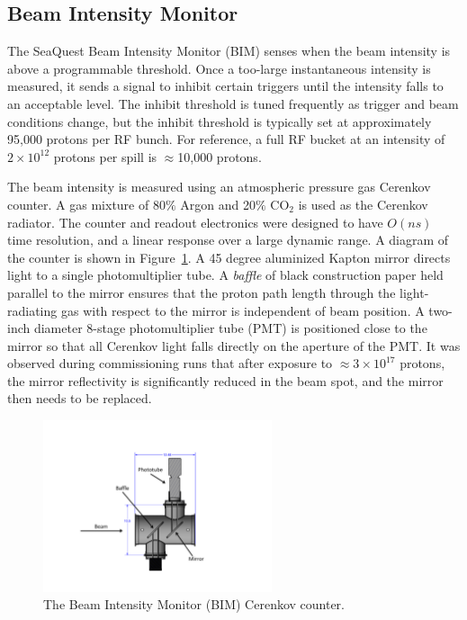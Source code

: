 \subsection{Beam Intensity Monitor}
The SeaQuest Beam Intensity Monitor (BIM) senses when the beam intensity is above a programmable threshold. Once a too-large instantaneous intensity is measured, it sends a signal to inhibit certain triggers until the intensity falls to an acceptable level.  The inhibit threshold is tuned frequently as trigger and beam conditions change, but the inhibit threshold is typically set at approximately 95,000 protons per RF bunch. For reference, a full RF bucket at an intensity of $2\times10^{12}$ protons per spill is $\approx$10,000 protons.

The beam intensity is measured using an atmospheric pressure gas Cerenkov counter. A gas mixture of 80$\%$ Argon and 20$\%$ CO$_2$ is used as the Cerenkov radiator. The counter and readout electronics were designed to have $O(ns)$ time resolution, and a linear response over a large dynamic range.  A diagram of the counter is shown in Figure~\ref{fig:BIMCerenkov}.  A 45 degree aluminized Kapton mirror directs light to a single photomultiplier tube.  A \emph{baffle} of black construction paper held parallel to the mirror ensures that the proton path length through the light-radiating gas with respect to the mirror is independent of beam position.  A two-inch diameter 8-stage photomultiplier tube (PMT) is positioned close to the mirror so that all Cerenkov light falls directly on the aperture of the PMT. It was observed during commissioning runs that after exposure to $\approx3\times10^{17}$ protons, the mirror reflectivity is significantly reduced in the beam spot, and the mirror then needs to be replaced.

\begin{figure}
\begin{center}
\includegraphics[width=0.6\textwidth]{figures/BIMCerenkov.pdf}
\caption{The Beam Intensity Monitor (BIM) Cerenkov counter.}
\label{fig:BIMCerenkov}
\end{center}
\end{figure}

